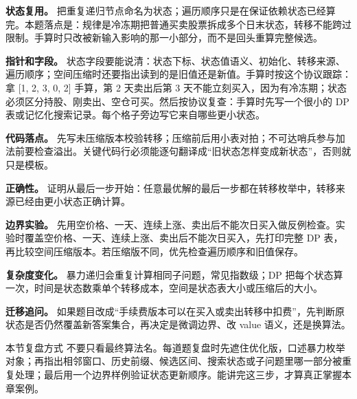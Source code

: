 \textbf{状态复用。} 把重复递归节点命名为状态；遍历顺序只是在保证依赖状态已经算完。本题落点是：规律是冷冻期把普通买卖股票拆成多个日末状态，转移不能跨过限制。手算时只改被新输入影响的那一小部分，而不是回头重算完整候选。

\textbf{指针和字段。} 状态字段要能说清：状态下标、状态值语义、初始化、转移来源、遍历顺序；空间压缩时还要指出读到的是旧值还是新值。手算时按这个协议跟踪：拿 [1, 2, 3, 0, 2] 手算，第 2 天卖出后第 3 天不能立刻买入，因为有冷冻期；状态必须区分持股、刚卖出、空仓可买。然后按协议复查：手算时先写一个很小的 DP 表或记忆化搜索记录。每个格子旁边写它来自哪些更小状态。

\textbf{代码落点。} 先写未压缩版本校验转移；压缩前后用小表对拍；不可达哨兵参与加法前要检查溢出。关键代码行必须能逐句翻译成“旧状态怎样变成新状态”，否则就只是模板。

\textbf{正确性。} 证明从最后一步开始：任意最优解的最后一步都在转移枚举中，转移来源已经由更小状态正确计算。

\textbf{边界实验。} 先用空价格、一天、连续上涨、卖出后不能次日买入做反例检查。实验时覆盖空价格、一天、连续上涨、卖出后不能次日买入，先打印完整 DP 表，再比较空间压缩版本。若压缩版不同，优先检查遍历顺序和旧值保存。

\textbf{复杂度变化。} 暴力递归会重复计算相同子问题，常见指数级；DP 把每个状态算一次，时间是状态数乘单个转移成本，空间是状态表大小或压缩后的大小。

\textbf{迁移追问。} 如果题目改成“手续费版本可以在买入或卖出转移中扣费”，先判断原状态是否仍然覆盖新答案集合，再决定是微调边界、改 value 语义，还是换算法。

\begin{principlebox}{本节复盘方式}
不要只看最终算法名。每道题复盘时先遮住优化版，口述暴力枚举对象；再指出相邻窗口、历史前缀、候选区间、搜索状态或子问题里哪一部分被重复处理；最后用一个边界样例验证状态更新顺序。能讲完这三步，才算真正掌握本章案例。
\end{principlebox}
